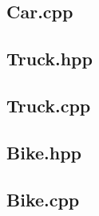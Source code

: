 \documentclass[12pt,naustrian,a4widepaper]{scrartcl}
\begin{document}
\subsection{Car.cpp}


\subsection{Truck.hpp}


\subsection{Truck.cpp}


\subsection{Bike.hpp}


\subsection{Bike.cpp}


%


\end{document}
